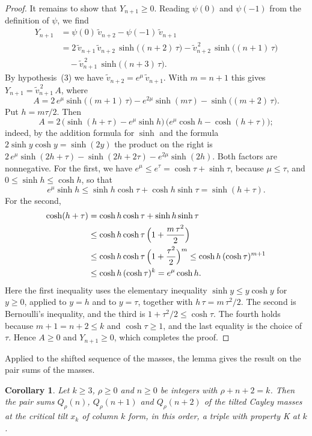 \documentclass{amsart}
\newtheorem{corollary}[theorem]{Corollary}
\theoremstyle{definition}
\theoremstyle{remark}
\numberwithin{equation}{section}
\begin{document}
\begin{proof}
It remains to show that $Y_{n+1}\ge0$. Reading $\psi(0)$ and $\psi(-1)$
from the definition of $\psi$, we find
\begin{align*}
Y_{n+1}&=\psi(0)\,\tilde v_{n+2}-\psi(-1)\,\tilde v_{n+1}\\
&=2\,\tilde v_{n+1}\,\tilde v_{n+2}\,\sinh\bigl((n+2)\,\tau\bigr)
-\tilde v_{n+2}^{\,2}\,\sinh\bigl((n+1)\,\tau\bigr)\\
&\quad-\tilde v_{n+1}^{\,2}\,\sinh\bigl((n+3)\,\tau\bigr).
\end{align*}
By hypothesis~(3) we have $\tilde v_{n+2}=e^{\mu}\,\tilde v_{n+1}$. With
$m=n+1$ this gives $Y_{n+1}=\tilde v_{n+1}^{\,2}\,A$, where
\[
A=2\,e^{\mu}\sinh\bigl((m+1)\,\tau\bigr)-e^{2\mu}\sinh(m\tau)
-\sinh\bigl((m+2)\,\tau\bigr).
\]
Put $h=m\tau/2$. Then
\[
A=2\,\bigl(\sinh(h+\tau)-e^{\mu}\sinh h\bigr)\,
\bigl(e^{\mu}\cosh h-\cosh(h+\tau)\bigr);
\]
indeed, by the addition formula for $\sinh$ and the formula
$2\sinh y\cosh y=\sinh(2y)$ the product on the right is
$2\,e^{\mu}\sinh(2h+\tau)-\sinh(2h+2\tau)-e^{2\mu}\sinh(2h)$. Both factors
are nonnegative. For the first, we have $e^{\mu}\le e^{\tau}
=\cosh\tau+\sinh\tau$, because $\mu\le\tau$, and $0\le\sinh h\le\cosh h$, so
that
\[
e^{\mu}\sinh h\le\sinh h\cosh\tau+\cosh h\sinh\tau=\sinh(h+\tau).
\]
For the second,
\begin{align*}
\cosh(h+\tau)&=\cosh h\cosh\tau+\sinh h\sinh\tau\\
&\le\cosh h\cosh\tau\,\Bigl(1+\frac{m\,\tau^2}{2}\Bigr)\\
&\le\cosh h\cosh\tau\,\Bigl(1+\frac{\tau^2}{2}\Bigr)^{m}
\le\cosh h\,(\cosh\tau)^{m+1}\\
&\le\cosh h\,(\cosh\tau)^{k}=e^{\mu}\cosh h .
\end{align*}
Here the first inequality uses the elementary inequality
$\sinh y\le y\cosh y$ for $y\ge0$, applied to $y=h$ and to $y=\tau$,
together with $h\,\tau=m\,\tau^2/2$. The second is Bernoulli's inequality,
and the third is $1+\tau^2/2\le\cosh\tau$. The fourth holds because
$m+1=n+2\le k$ and $\cosh\tau\ge1$, and the last equality is the choice of
$\tau$. Hence $A\ge0$ and $Y_{n+1}\ge0$, which completes the proof.
\end{proof}

Applied to the shifted sequence of the masses, the lemma gives the result on
the pair sums of the masses.

\begin{corollary}\label{cor:pairsumsk}
Let $k\ge3$, $\rho\ge0$ and $n\ge0$ be integers with $\rho+n+2=k$. Then the
pair sums $Q_\rho(n)$, $Q_\rho(n+1)$ and $Q_\rho(n+2)$ of the tilted Cayley
masses at the critical tilt $x_k$ of column $k$ form, in this order, a
triple with property K at $k$.
\end{corollary}
\end{document}

